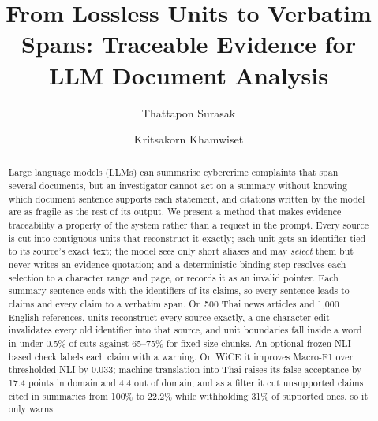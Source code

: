 \documentclass[runningheads]{llncs}
\begin{document}
\title{From Lossless Units to Verbatim Spans: Traceable Evidence for LLM Document Analysis}

\author{Thattapon Surasak \and Kritsakorn Khamwiset}

\maketitle

\begin{abstract}
Large language models (LLMs) can summarise cybercrime complaints that span several documents, but an
investigator cannot act on a summary without knowing which document sentence supports each statement,
and citations written by the model are as fragile as the rest of its output. We present a method that
makes evidence traceability a property of the system rather than a request in the prompt. Every source
is cut into contiguous units that reconstruct it exactly; each unit gets an identifier tied to its
source's exact text; the model sees only short aliases and may \emph{select} them but never writes an evidence
quotation; and a deterministic binding step resolves each selection to a character range and page, or
records it as an invalid pointer. Each summary sentence ends with the identifiers of its claims, so every
sentence leads to claims and every claim to a verbatim span. On 500 Thai news articles and 1,000 English
references, units reconstruct every source exactly, a one-character edit invalidates every old
identifier into that source, and unit boundaries fall inside a word in under 0.5\% of cuts against
65--75\% for fixed-size chunks. An optional frozen NLI-based check labels each claim with a warning. On
WiCE it improves Macro-F1 over thresholded NLI by 0.033; machine translation into Thai raises its false
acceptance by 17.4 points in domain and 4.4 out of domain; and as a filter it cut unsupported
claims cited in summaries from 100\% to 22.2\% while withholding 31\% of supported ones, so it only warns.

\end{abstract}
\end{document}
